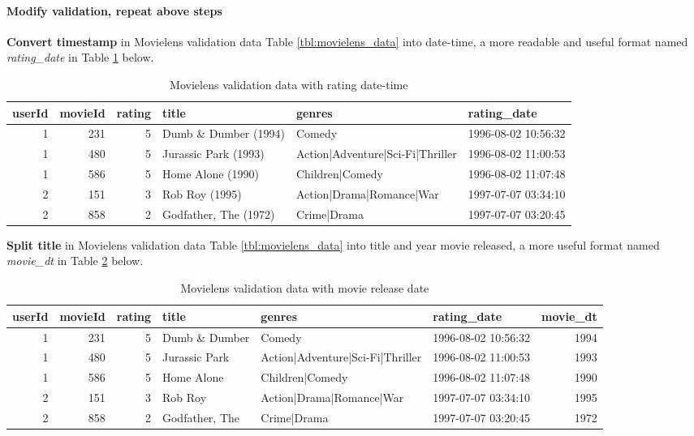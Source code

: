 \documentclass[
]{article}
\begin{document}
\newpage

\hypertarget{modify-validation-repeat-above-steps}{%
\paragraph{Modify validation, repeat above
steps}\label{modify-validation-repeat-above-steps}}

\textbf{Convert timestamp} in Movielens validation data Table
\ref{tbl:movielens_data} into date-time, a more readable and useful
format named \emph{rating\_date} in Table
\ref{tbl:movielens_val_data_rating_date} below.

\begin{table}[H]

\caption{\label{tab:dw_3}Movielens validation data with rating date-time\label{tbl:movielens_val_data_rating_date}}
\centering
\fontsize{8}{10}\selectfont
\begin{tabular}[t]{rrrlll}
\toprule
userId & movieId & rating & title & genres & rating\_date\\
\midrule
1 & 231 & 5 & Dumb \& Dumber (1994) & Comedy & 1996-08-02 10:56:32\\
1 & 480 & 5 & Jurassic Park (1993) & Action|Adventure|Sci-Fi|Thriller & 1996-08-02 11:00:53\\
1 & 586 & 5 & Home Alone (1990) & Children|Comedy & 1996-08-02 11:07:48\\
2 & 151 & 3 & Rob Roy (1995) & Action|Drama|Romance|War & 1997-07-07 03:34:10\\
2 & 858 & 2 & Godfather, The (1972) & Crime|Drama & 1997-07-07 03:20:45\\
\bottomrule
\end{tabular}
\end{table}

\textbf{Split title} in Movielens validation data Table
\ref{tbl:movielens_data} into title and year movie released, a more
useful format named \emph{movie\_dt} in Table
\ref{tbl:movielens_val_movie_release_date} below.

\begin{table}[H]

\caption{\label{tab:dw_4}Movielens validation data with movie release date\label{tbl:movielens_val_movie_release_date}}
\centering
\fontsize{8}{10}\selectfont
\begin{tabular}[t]{rrrlllr}
\toprule
userId & movieId & rating & title & genres & rating\_date & movie\_dt\\
\midrule
1 & 231 & 5 & Dumb \& Dumber & Comedy & 1996-08-02 10:56:32 & 1994\\
1 & 480 & 5 & Jurassic Park & Action|Adventure|Sci-Fi|Thriller & 1996-08-02 11:00:53 & 1993\\
1 & 586 & 5 & Home Alone & Children|Comedy & 1996-08-02 11:07:48 & 1990\\
2 & 151 & 3 & Rob Roy & Action|Drama|Romance|War & 1997-07-07 03:34:10 & 1995\\
2 & 858 & 2 & Godfather, The & Crime|Drama & 1997-07-07 03:20:45 & 1972\\
\bottomrule
\end{tabular}
\end{table}
\end{document}

